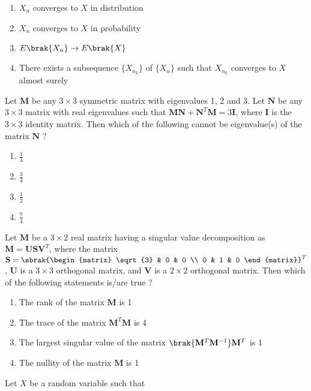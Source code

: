 \begin{enumerate}
    \item $X_n$ converges to $X$ in distribution
    \item $X_n$ converges to $X$ in probability
    \item $E\brak{X_n} \rightarrow E\brak{X}$
    \item There exists a subsequence $\{X_{n_k}\}$ of $\{X_n\}$ such that $X_{n_k}$ converges to $X$ almost surely \\
\end{enumerate}
\item Let $\mathbf{M}$ be any $3 \times 3$ symmetric matrix with eigenvalues 1, 2 and 3. Let $\mathbf{N}$ be any $3 \times 3$ matrix with real eigenvalues such that $\mathbf{MN} + \mathbf{N}^T\mathbf{M} = 3\mathbf{I}$, where $\mathbf{I}$ is the $3 \times 3$ identity matrix. Then which of the following cannot be eigenvalue(s) of the matrix $\mathbf{N}$ ? 
\begin{enumerate}
    \item $\frac{1}{4}$
    \item $\frac{3}{4}$
    \item $\frac{1}{2}$
    \item $\frac{7}{4}$ \\
\end{enumerate}
\item Let $\mathbf{M}$ be a $3 \times 2$ real matrix having a singular value decomposition as $\mathbf{M} = \mathbf{USV}^T$, where the matrix $\mathbf{S} = \sbrak{\begin{matrix}
    \sqrt{3} & 0 & 0 \\ 0 & 1 & 0
\end{matrix}}^T$, $\mathbf{U}$ is a $3 \times 3$ orthogonal matrix, and $\mathbf{V}$ is a $2 \times 2$ orthogonal matrix. Then which of the following statements is/are true ? 
\begin{enumerate}
    \item The rank of the matrix $\mathbf{M}$ is 1
    \item The trace of the matrix $\mathbf{M}^T\mathbf{M}$ is 4
    \item The largest singular value of the matrix $\brak{\mathbf{M}^T\mathbf{M}^{-1}}\mathbf{M}^T$ is 1
    \item The nullity of the matrix $\mathbf{M}$ is 1 \\ 
\end{enumerate}
\item Let $X$ be a random variable such that 
